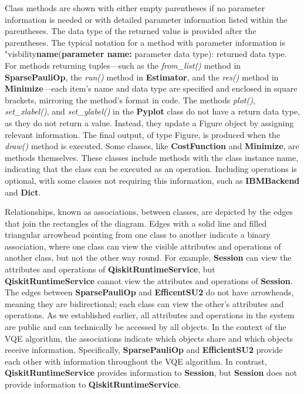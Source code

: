 \documentclass{article}
\begin{document}
{Class methods are shown with either empty parentheses if no parameter information is needed or with detailed parameter information listed within the parentheses. The data type of the returned value is provided after the parentheses. The typical notation for a method with parameter information is "visbility\textbf{name}(\textbf{parameter name:} parameter data type): returned data type. For methods returning tuples—such as the \textit{from\_list()} method in \textbf{SparsePauliOp}, the \textit{run()} method in \textbf{Estimator}, and the \textit{res()} method in \textbf{Minimize}—each item's name and data type are specified and enclosed in square brackets, mirroring the method's format in code. 
The methods \textit{plot()}, \textit{set\_xlabel()}, and \textit{set\_ylabel()} in the \textbf{Pyplot} class do not have a return data type, as they do not return a value. Instead, they update a Figure object by assigning relevant information. The final output, of type Figure, is produced when the \textit{draw()} method is executed. Some classes, like \textbf{CostFunction} and \textbf{Minimize}, are methods themselves. These classes include methods with the class instance name, indicating that the class can be executed as an operation. Including operations is optional, with some classes not requiring this information, such as \textbf{IBMBackend} and \textbf{Dict}. 

Relationships, known as associations, between classes, are depicted by the edges that join the rectangles of the diagram. Edges with a solid line and filled triangular arrowhead pointing from one class to another indicate a binary association, where one class can view the visible attributes and operations of another class, but not the other way round\cite{Seidl_Scholz_Huemer_Kappel_Duffy_2014}. For example, \textbf{Session} can view the attributes and operations of \textbf{QiskitRuntimeService}, but \textbf{QiskitRuntimeService} cannot view the attributes and operations of \textbf{Session}. The edges between \textbf{SparsePauliOp} and \textbf{EfficentSU2} do not have arrowheads, meaning they are bidirectional\cite{Seidl_Scholz_Huemer_Kappel_Duffy_2014}; each class can view the other's attributes and operations. As we established earlier, all attributes and operations in the system are public and can technically be accessed by all objects. In the context of the VQE algorithm, the associations indicate which objects share and which objects receive information. Specifically, \textbf{SparsePauliOp} and \textbf{EfficientSU2} provide each other with information throughout the VQE algorithm. In contrast, \textbf{QiskitRuntimeService} provides information to \textbf{Session}, but \textbf{Session} does not provide information to \textbf{QiskitRuntimeService}.

}
\end{document}
